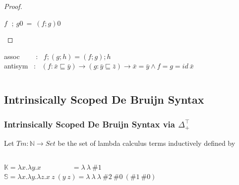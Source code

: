 \documentclass[aspectratio=169]{beamer}
\theoremstyle{remarkstyle}
\begin{document}
\begin{frame}[fragile]
\begin{columns}
\begin{column}{0.62\textwidth}
\begin{proof}
\begin{small}
        $f \ \ \, ; \ g 0 \ = \ (f;g)0$
        \end{small}
      \end{proof}
      \begin{corollary}
        \begin{small}
        assoc \ \ \ \ : \ $f;(g;h) = (f;g);h$\\
        antisym \ : \ $(f : \bar{x} ⊑ \bar{y}) → (g : \bar{y} ⊑ \bar{z}) → \bar{x} = \bar{y} \land f = g = id \ \bar{x}$
        \end{small}
      \end{corollary}  
    \end{column}
  \end{columns}
\end{frame}


\subsection{Intrinsically Scoped De Bruijn Syntax}

\begin{frame}[fragile]
  \frametitle{Intrinsically Scoped De Bruijn Syntax via $Δ_+^⊤$}
  \begin{definition}
    Let $Tm : ℕ → Set$ be the set of lambda calculus terms inductively defined by
    \begin{columns}
      \begin{column}{0.2\textwidth}
        \begin{center}
        \end{center}
      \end{column}
      \begin{column}{0.3\textwidth}
        \begin{center}
        \end{center}
      \end{column}
      \begin{column}{0.3\textwidth}
        \begin{center}
        \end{center}
      \end{column}
    \end{columns}
  \end{definition}
  \begin{example}
    $𝕂 = λx. λy. x \quad \quad \quad \quad \ \ = λ \ λ \ \#1$\\
    $𝕊 = λx. λy. λz. x \ z \ (y \ z) = λ \ λ \ λ \ \#2 \ \#0 \ (\#1 \ \#0)$
  \end{example}
\end{frame}
\end{document}

